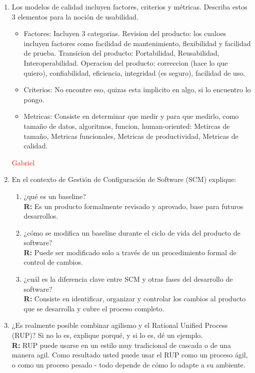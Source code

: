 \begin{enumerate}
	\item Los modelos de calidad incluyen factores, criterios y métricas. Describa estos 3 elementos para la noción de usabilidad.\\
	\begin{itemize}
	\item Factores: Incluyen 3 categorias. Revision del producto: los cualoes incluyen factores como facilidad de mantenimiento, flexibilidad y facilidad de prueba. Transicion del producto: Portabilidad, Reusabilidad, Interoperabilidad. Operacion del producto: correccion (hace lo que quiero), confiabilidad, eficiencia, integridad (es seguro), facilidad de uso.
	\item Criterios: No encontre eso, quizas esta implicito en algo, si lo encuentro lo pongo.
	\item Metricas: Consiste en determinar que medir y para que medirlo, como tama\~no de datos, algoritmos, funcion, human-oriented: Metircas de tama\~no, Metricas funcionales, Metricas de productividad, Metricas de calidad.
	\end{itemize}
	\textcolor{red}{Gabriel}

	\item  En el contexto de Gestión de Configuración de Software (SCM) explique:
		\begin{enumerate}
			\item ¿qué es un baseline?\\
			\textbf{R:}
			Es un producto formalmente revisado y aprovado, base para futuros desarrollos.
			\item ¿cómo se modifica un baseline durante el ciclo de vida del producto de software?\\
			\textbf{R:}
			Puede ser modificado solo a través de un procedimiento formal de control de cambios.
			\item ¿cuál es la diferencia clave entre SCM y otras fases del desarrollo de software?\\
			\textbf{R:}
			Consiste en identificar, organizar y controlar los cambios al producto que se desarrolla y cubre el proceso completo.
		\end{enumerate}
	\item  ¿Es realmente posible combinar agilismo y el Rational Unified Process (RUP)? Si no lo es, explique porqué, y si lo es, dé un ejemplo.\\
	\textbf{R:}
	RUP puede usarse en un estilo muy tradicional de cascada o de una manera agil. Como resultado usted puede usar el RUP como un proceso ágil, o como un proceso pesado - todo depende de cómo lo adapte a su ambiente. 	



\end{enumerate}
